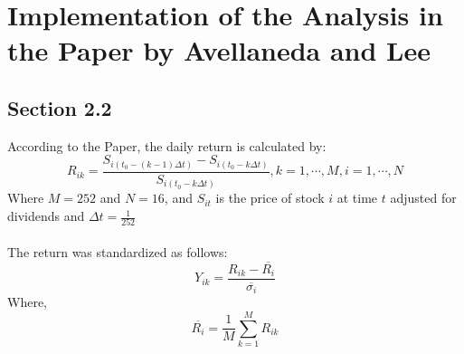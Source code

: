 \documentclass[12pt, letterpaper, twoside]{article}
\begin{document}
    \section{Implementation of the Analysis in the Paper by Avellaneda and Lee}
    \subsection{Section 2.2}
    According to the Paper, the daily return is calculated by:
    $$R_{ik}=\frac{S_{i(t_0-(k-1)\Delta t)}-
    S_{i(t_0-k\Delta t)}}{S_{i(t_0-k\Delta t)}}, 
    k=1, \cdots, M, i=1, \cdots, N $$
    Where $M=252$ and $N=16$, and $S_{it}$ is the price of 
    stock $i$ at time $t$ adjusted for dividends and 
    $\Delta t=\frac{1}{252}$\\\\
    The return was standardized as follows:
    $$Y_{ik} = \frac{R_{ik}-\overline{R_i} }{\overline{\sigma _i}}$$
    Where,
    $$\overline{R_i}=\frac{1}{M}\sum_{k = 1}^{M} R_{ik} $$
\end{document}

